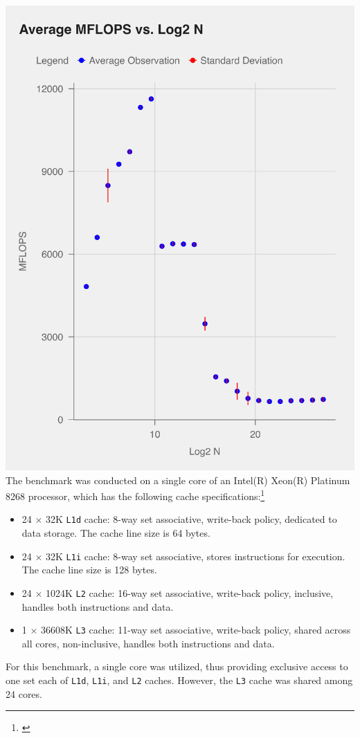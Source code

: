 \documentclass{article}
\newcommand{\MYhref}[3][blue]{\href{#2}{\color{#1}{#3}}}%
\begin{document}
\begin{multicols}{2}
    \includegraphics[width=.45\textwidth]{../part2/data/part_2_plot.png}
    \columnbreak
    \newpage
    \noindent The benchmark was conducted on a single core of an Intel(R) Xeon(R) Platinum 8268 processor, which has the following cache specifications:\footnote{\MYhref{https://www.cpu-world.com/CPUs/Xeon/Intel-Xeon\%208268.html}{Cpu World source for cache info.}}
    \begin{itemize}
        \item 24 $\times$ 32K \texttt{L1d} cache: 8-way set associative, write-back policy, dedicated to data storage. The cache line size is 64 bytes.
        \item 24 $\times$ 32K \texttt{L1i} cache: 8-way set associative, stores instructions for execution. The cache line size is 128 bytes.
        \item 24 $\times$ 1024K \texttt{L2} cache: 16-way set associative, write-back policy, inclusive, handles both instructions and data.
        \item 1 $\times$ 36608K \texttt{L3} cache: 11-way set associative, write-back policy, shared across all cores, non-inclusive, handles both instructions and data.
    \end{itemize}
\end{multicols}
\newpage
\noindent For this benchmark, a single core was utilized, thus providing exclusive access to one set each of \texttt{L1d}, \texttt{L1i}, and \texttt{L2} caches. However, the \texttt{L3} cache was shared among 24 cores. 
\end{document}
